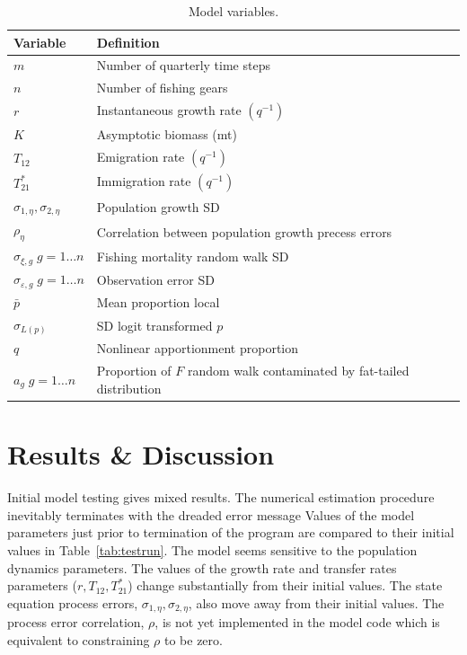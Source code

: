 \documentclass[12pt,letterpaper]{article}
\newcommand\help[1]{\color{Magenta}{\it #1 }\normalcolor}
\begin{document}
\begin{table}
\caption{Model variables.
\label{tab:allvars}}
\begin{center}
\begin{tabular}{ll}
\hline
Variable & Definition\\
\hline
\hline
$m$ & Number of quarterly time steps\\
$n$ & Number of fishing gears\\
\hline
\hline
$r$ & Instantaneous growth rate $(q^{-1})$\\
$K$ & Asymptotic biomass (mt) \\
$T_{12}$ & Emigration rate $(q^{-1})$\\
$T^*_{21}$& Immigration rate $(q^{-1})$\\
$\sigma_{1,\eta}, \sigma_{2,\eta}$ & Population growth SD\\
$\rho_\eta$ & Correlation between population growth precess errors\\
$\sigma_{\xi,g}\; g=1\ldots n$ & Fishing mortality random walk SD\\
$\sigma_{\varepsilon,g}\; g=1\ldots n$ & Observation error SD \\
$\bar{p}$ & Mean proportion local\\
$\sigma_{L(p)}$ & SD logit transformed $p$\\
$q$ & Nonlinear apportionment proportion\\
$a_g\; g=1\ldots n$ & Proportion of $F$ random walk contaminated by 
fat-tailed distribution\\
\hline
\end{tabular}
\end{center}
\end{table}


\section*{Results \& Discussion}
Initial model testing gives mixed results. The numerical estimation
procedure inevitably terminates with the dreaded error message 
\help{``Matrix not positive definite in Ln\_det\_choleski''.}
Values of the model parameters just prior to termination of the program are
compared to their initial values in Table~\ref{tab:testrun}.
The model seems sensitive to the population dynamics parameters. The
values of the
growth rate and transfer rates parameters ($r,T_{12}, T_{21}^*$)
change substantially from their initial values.
The state equation process errors, $\sigma_{1,\eta},\sigma_{2,\eta}$,
also move away from their initial values.
The process error correlation, $\rho$, is not yet implemented in the model
code which is equivalent to constraining $\rho$ to be zero.
\end{document}
